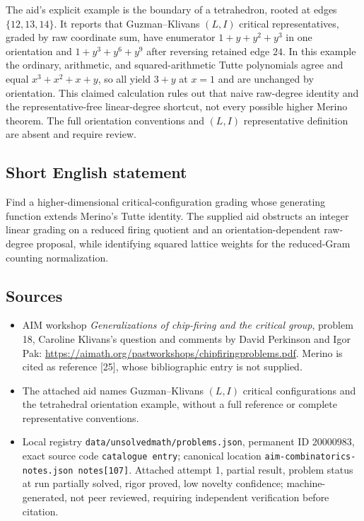 \documentclass[11pt]{article}
\begin{document}
The aid's explicit example is the boundary of a tetrahedron, rooted at edges $\{12,13,14\}$. It reports that Guzman--Klivans $(L,I)$ critical representatives, graded by raw coordinate sum, have enumerator $1+y+y^2+y^3$ in one orientation and $1+y^3+y^6+y^9$ after reversing retained edge $24$. In this example the ordinary, arithmetic, and squared-arithmetic Tutte polynomials agree and equal $x^3+x^2+x+y$, so all yield $3+y$ at $x=1$ and are unchanged by orientation. This claimed calculation rules out that naive raw-degree identity and the representative-free linear-degree shortcut, not every possible higher Merino theorem. The full orientation conventions and $(L,I)$ representative definition are absent and require review.
\subsection{Short English statement}
Find a higher-dimensional critical-configuration grading whose generating function extends Merino's Tutte identity. The supplied aid obstructs an integer linear grading on a reduced firing quotient and an orientation-dependent raw-degree proposal, while identifying squared lattice weights for the reduced-Gram counting normalization.
\subsection{Sources}
\begin{itemize}
\item AIM workshop \emph{Generalizations of chip-firing and the critical group}, problem 18, Caroline Klivans's question and comments by David Perkinson and Igor Pak: \url{https://aimath.org/pastworkshops/chipfiringproblems.pdf}. Merino is cited as reference [25], whose bibliographic entry is not supplied.
\item The attached aid names Guzman--Klivans $(L,I)$ critical configurations and the tetrahedral orientation example, without a full reference or complete representative conventions.
\item Local registry \texttt{data/unsolvedmath/problems.json}, permanent ID 20000983, exact source code \texttt{catalogue entry}; canonical location \texttt{aim-combinatorics-notes.json notes[107]}. Attached attempt 1, partial result, problem status at run partially solved, rigor proved, low novelty confidence; machine-generated, not peer reviewed, requiring independent verification before citation.
\end{itemize}
\end{document}
